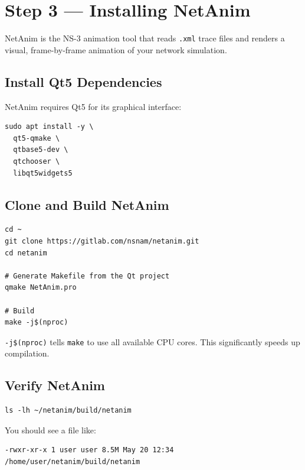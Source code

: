 \documentclass[12pt,a4paper]{article}
\newenvironment{notebox}
  {\begin{tcolorbox}[
      colback   = infoblue!8,
      colframe  = infoblue,
      fonttitle = \bfseries,
      title     = \textcolor{infoblue}{$\blacktriangleright$\; Note},
      breakable
  ]}
  {\end{tcolorbox}}
\newcommand{\cmd}[1]{\texttt{\color{codeblue}#1}}
\newcommand{\file}[1]{\texttt{\color{codered}#1}}
\begin{document}
\section{Step 3 — Installing NetAnim}

NetAnim is the NS-3 animation tool that reads \file{.xml} trace files and renders a visual, frame-by-frame animation of your network simulation.

\subsection{Install Qt5 Dependencies}

NetAnim requires Qt5 for its graphical interface:

\begin{lstlisting}[style=bash, caption={Install Qt5 for NetAnim}]
sudo apt install -y \
  qt5-qmake \
  qtbase5-dev \
  qtchooser \
  libqt5widgets5
\end{lstlisting}

\subsection{Clone and Build NetAnim}

\begin{lstlisting}[style=bash, caption={Clone and build NetAnim}]
cd ~
git clone https://gitlab.com/nsnam/netanim.git
cd netanim

# Generate Makefile from the Qt project
qmake NetAnim.pro

# Build
make -j$(nproc)
\end{lstlisting}

\begin{notebox}
\cmd{-j\$(nproc)} tells \cmd{make} to use all available CPU cores. This significantly speeds up compilation.
\end{notebox}

\subsection{Verify NetAnim}

\begin{lstlisting}[style=bash, caption={Verify NetAnim executable}]
ls -lh ~/netanim/build/netanim
\end{lstlisting}

You should see a file like:
\begin{lstlisting}[style=output]
-rwxr-xr-x 1 user user 8.5M May 20 12:34 /home/user/netanim/build/netanim
\end{lstlisting}
\end{document}
